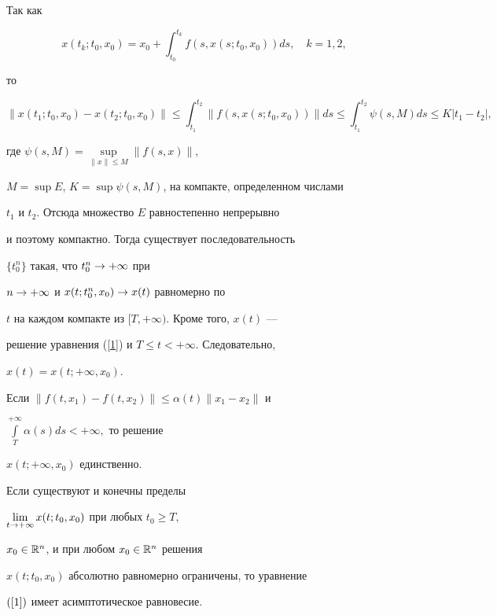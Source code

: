 \begin{pf}


Так как


$$


x(t_{k};t_{0},x_{0})=x_{0}+\int_{t_{0}}^{t_{k}}f(s,x(s;t_{0},x_{0}))ds,


\quad k=1,2,


$$


то


$$


\|x(t_{1};t_{0},x_{0})-x(t_{2};t_{0},x_{0})\| \leq


\int_{t_{1}}^{t_{2}}\|f(s,x(s;t_{0},x_{0}))\|ds\leq


\int_{t_{1}}^{t_{2}} \psi(s,M)ds \leq K|t_{1}-t_{2}|,


$$


где $\psi(s,M)=\sup\limits_{\|x\| \leq M}\|f(s,x)\|$,


$M=\sup E$, $K= \sup \psi(s,M)$, на компакте, определенном числами


$t_{1}$ и $t_{2}$. Отсюда множество $E$ равностепенно непрерывно


и поэтому компактно. Тогда существует последовательность


$\lbrace t_{0}^{n} \rbrace$ такая, что $t_{0}^{n} \rightarrow +\infty$ при


$n \rightarrow +\infty$ и $x(t;t_{0}^{n},x_{0}) \rightarrow x(t)$ равномерно по


$t$ на каждом компакте из $[T, +\infty)$. Кроме того, $x(t)$ ---


решение уравнения (\ref{1}) и $T \leq t<+ \infty$. Следовательно,


$x(t)=x(t;+\infty,x_{0})$.





Если $\|f(t,x_{1})-f(t,x_{2})\| \leq


\alpha(t)\|x_{1}-x_{2}\|$ и


$\int\limits_{T}^{+\infty}\alpha(s)ds<+\infty,$ то решение


$x(t;+\infty,x_{0})$ единственно.


\end{pf}





\begin{thm}\label{T_3}


Если существуют и конечны пределы


$\lim\limits_{t \rightarrow +\infty}x(t;t_{0},x_{0})$ при любых $t_{0} \geq T$,


$x_{0} \in {\Bbb R}^{n}$, и при любом $x_{0} \in {\Bbb R}^{n}$ решения


$x(t;t_{0},x_{0})$ абсолютно равномерно ограничены, то уравнение


$(\ref{1})$ имеет асимптотическое равновесие.


\end{thm}





